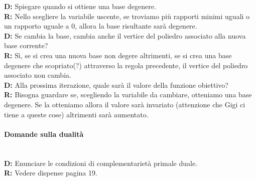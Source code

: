 \documentclass[10pt,                    %
               a4paper,                 %
               twoside,                 %
               openright,               %
               english,                 
               italian,                 
]{article}
\begin{document}
\textbf{D:} Spiegare quando si ottiene una base degenere. \\
\textbf{R:} Nello scegliere la variabile uscente, se troviamo più rapporti minimi uguali o un rapporto uguale a 0, allora la base risultante sarà degenere. \\

\textbf{D:} Se cambia la base, cambia anche il vertice del poliedro associato alla nuova base corrente? \\
\textbf{R:} Sì, se si crea una nuova base non degere altrimenti, se si crea una base degenere che scopriato(?) attraverso la regola precedente, il vertice del poliedro associato non cambia. \\

\textbf{D:} Alla prossima iterazione, quale sarà il valore della funzione obiettivo? \\
\textbf{R:} Bisogna guardare se, scegliendo la variabile da cambiare, otteniamo una base degenere. Se la otteniamo allora il valore sarà invariato (attenzione che Gigi ci tiene a queste cose) altrimenti sarà aumentato. \\

\paragraph{Domande sulla dualità} \mbox{} \\
\textbf{D:} Enunciare le condizioni di complementarietà primale duale. \\
\textbf{R:} Vedere dispense pagina 19.  \\ 
\end{document}

